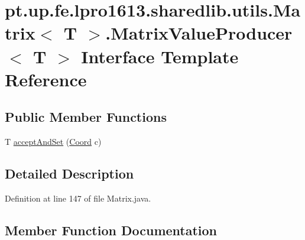 \hypertarget{interfacept_1_1up_1_1fe_1_1lpro1613_1_1sharedlib_1_1utils_1_1_matrix_1_1_matrix_value_producer}{}\section{pt.\+up.\+fe.\+lpro1613.\+sharedlib.\+utils.\+Matrix$<$ T $>$.Matrix\+Value\+Producer$<$ T $>$ Interface Template Reference}
\label{interfacept_1_1up_1_1fe_1_1lpro1613_1_1sharedlib_1_1utils_1_1_matrix_1_1_matrix_value_producer}
\subsection*{Public Member Functions}
\begin{DoxyCompactItemize}
\item 
T \hyperlink{interfacept_1_1up_1_1fe_1_1lpro1613_1_1sharedlib_1_1utils_1_1_matrix_1_1_matrix_value_producer_a72bccfaca2fe980992dc8d2a8a449878}{accept\+And\+Set} (\hyperlink{classpt_1_1up_1_1fe_1_1lpro1613_1_1sharedlib_1_1utils_1_1_coord}{Coord} c)
\end{DoxyCompactItemize}


\subsection{Detailed Description}


Definition at line 147 of file Matrix.\+java.



\subsection{Member Function Documentation}
\hypertarget{interfacept_1_1up_1_1fe_1_1lpro1613_1_1sharedlib_1_1utils_1_1_matrix_1_1_matrix_value_producer_a72bccfaca2fe980992dc8d2a8a449878}{}\label{interfacept_1_1up_1_1fe_1_1lpro1613_1_1sharedlib_1_1utils_1_1_matrix_1_1_matrix_value_producer_a72bccfaca2fe980992dc8d2a8a449878} 
